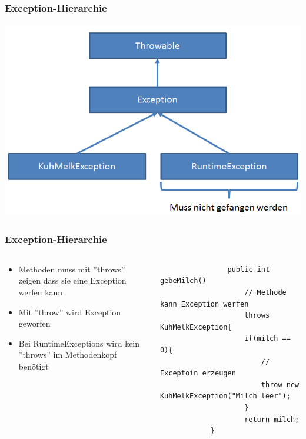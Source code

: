 \begin{frame}[fragile]
	\frametitle{Exception-Hierarchie}
	\center
	\includegraphics[width=1\textwidth,
	keepaspectratio=true]{bilder/exceptions.png}
\end{frame}

\begin{frame}[fragile]
	\frametitle{Exception-Hierarchie}
	\begin{columns}
		\begin{column}{0.5\textwidth}
			\small
			\begin{itemize}
			  \item Methoden muss mit ''throws'' zeigen dass sie eine Exception 
			  werfen kann 
			  \item Mit ''throw'' wird Exception geworfen
			  \item Bei RuntimeExceptions wird kein ''throws'' im
			  Methodenkopf ben\"otigt
			\end{itemize}
		\end{column}
		\begin{column}{0.5\textwidth}
			\begin{lstlisting}
				public int gebeMilch() 
					// Methode kann Exception werfen
					throws KuhMelkException{
					if(milch == 0){
						// Exceptoin erzeugen
						throw new KuhMelkException("Milch leer");
					}
					return milch;
			}
			\end{lstlisting}
		\end{column}
	\end{columns}
\end{frame}

